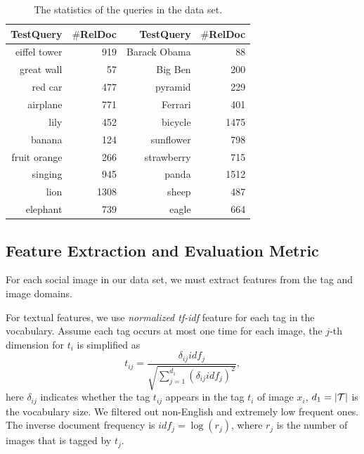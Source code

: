 \begin{table}[t]
\centering \caption{The statistics of the queries in the data set. }
\begin{center}
\begin{tabular}{|rr|rr|}
\hline
TestQuery&$\#$RelDoc &TestQuery &$\#$RelDoc\\
\hline
\hline
eiffel tower &919&Barack Obama&88\\
great wall &57&Big Ben&200\\
red car&477&pyramid&229\\
airplane&771&Ferrari&401\\
lily&452&bicycle&1475\\
banana&124&sunflower&798\\
fruit orange&266&strawberry&715\\
singing&945&panda&1512\\
lion&1308&sheep&487\\
elephant&739&eagle&664\\
\hline
\end{tabular}
\end{center}
\label{table:query}
\end{table}

\subsection{Feature Extraction and Evaluation Metric}

For each social image in our data set, we must extract features from the tag and image domains.

For textual features, we use {\em normalized tf-idf} feature for each tag in the vocabulary. Assume each tag occurs at most one time for each image, the $j$-th dimension for $t_i$ is simplified as
\[
t_{ij} = \frac{\delta_{ij}idf_j}{\sqrt{\sum_{j=1}^{d_1}(\delta_{ij}idf_j)^2}},
\]
here $\delta_{ij}$ indicates whether the tag $t_{ij}$ appears in the tag $t_i$ of image $x_i$, $d_1=|{\cal T}|$ is the vocabulary size. We filtered out non-English and extremely low frequent ones. The inverse document frequency is $idf_j = \log(r_j)$, where $r_j$ is the number of images that is tagged by $t_j$.

